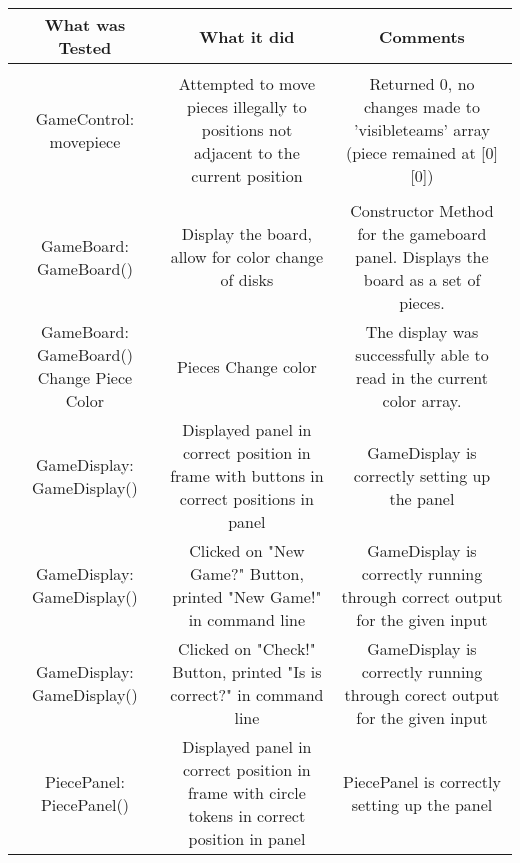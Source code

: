 \documentclass[12pt]{article}
\begin{document}
	\begin{tabularx}{\linewidth}{|C|C|C|}
		\hline
		What was Tested & What it did & Comments \\
		\hline \\
		 GameControl: movepiece & Attempted to move pieces illegally to positions not adjacent to the current position & Returned 0, no changes made to 'visibleteams' array (piece remained at [0][0]) \\    
		 \hline \\
		GameBoard: GameBoard() & Display the board, allow for color change of disks & Constructor Method for the gameboard panel. Displays the board as a set of pieces. \\
		\hline
		GameBoard: GameBoard() Change Piece Color& Pieces Change color & The display was successfully able to read in the current color array. \\
		\hline
	
		GameDisplay: GameDisplay() & Displayed panel in correct position in frame with buttons in correct positions in panel & GameDisplay is correctly setting up the panel \\
		\hline
		GameDisplay: GameDisplay()& Clicked on "New Game?" Button,  printed "New Game!" in command line & GameDisplay is correctly running through correct output for the given input \\
		\hline
		GameDisplay: GameDisplay() & Clicked on "Check!" Button, printed "Is is correct?" in command line & GameDisplay is correctly running through corect output for the given input \\
		\hline
		PiecePanel: PiecePanel() & Displayed panel in correct position in frame with circle tokens in correct position in panel & PiecePanel is correctly setting up the panel \\
		\hline
	\end{tabularx}
	\newpage
\end{document}
